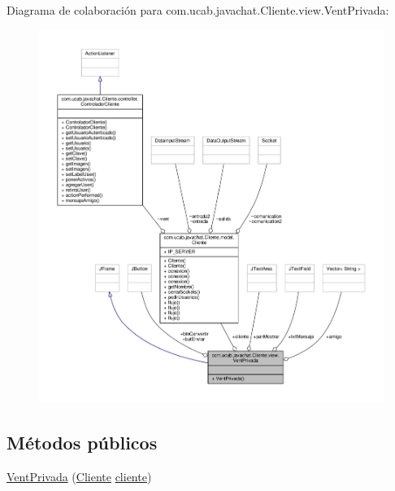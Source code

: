 Diagrama de colaboración para com.\-ucab.\-javachat.\-Cliente.\-view.\-Vent\-Privada\-:\nopagebreak
\begin{figure}[H]
\begin{center}
\leavevmode
\includegraphics[width=350pt]{classcom_1_1ucab_1_1javachat_1_1_cliente_1_1view_1_1_vent_privada__coll__graph}
\end{center}
\end{figure}
\subsection*{Métodos públicos}
\begin{DoxyCompactItemize}
\item 
\hyperlink{classcom_1_1ucab_1_1javachat_1_1_cliente_1_1view_1_1_vent_privada_aaa44d867cf18c8a0d5957af7592c5731}{Vent\-Privada} (\hyperlink{classcom_1_1ucab_1_1javachat_1_1_cliente_1_1model_1_1_cliente}{Cliente} \hyperlink{classcom_1_1ucab_1_1javachat_1_1_cliente_1_1view_1_1_vent_privada_aa8819d3a727764f7d06a273e8a4719dd}{cliente})
\end{DoxyCompactItemize}

